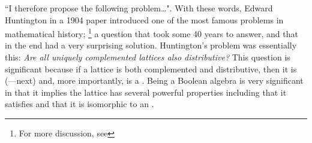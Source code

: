 %
%



``I therefore propose the following problem\ldots".
With these words, Edward Huntington in a 1904 paper introduced one of the most
famous problems in mathematical history;%
\footnote{For more discussion, see }
a question that took some 40 years to answer,
and that in the end had a very surprising solution.
Huntington's problem was essentially this:
\emph{Are all uniquely complemented lattices also distributive?}
This question is significant because if a lattice is both complemented and distributive,
then it is  (---next)
and, more importantly, is a .
Being a Boolean algebra is very significant in that it implies the lattice
has several powerful properties including that
it satisfies  
and that it is isomorphic to an  .

